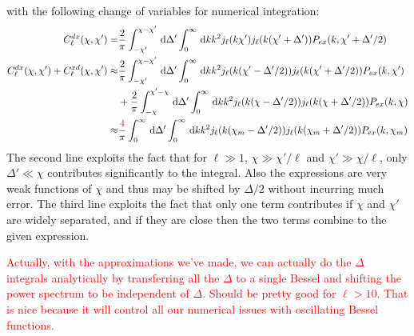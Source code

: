 \documentclass[twocolumn,prl,nofootinbib]{revtex4-1}
\newcommand{\ud}{\,\mathrm{d}}
\newcommand{\red}{\textcolor{red}}
\begin{document}
\begin{widetext}
with the following change of variables for numerical integration:
\begin{align}
C^{dx}_\ell(\chi,\chi')
    =&
    \frac{2}{\pi}
    \int_{-\chi'}^{\chi - \chi'}\ud\Delta'
    \int_0^\infty\ud k k^2 j_\ell(k\chi')
    j_{\ell}(k(\chi'+\Delta'))
    P_{ex}(k, \chi' + \Delta'/2)
    \\
C^{dx}_\ell(\chi,\chi') + C^{xd}_\ell(\chi,\chi')
    \approx&
    \frac{2}{\pi}
    \int_{-\chi'}^{\chi - \chi'}\ud\Delta'
    \int_0^\infty\ud k k^2 j_\ell(k(\chi'-\Delta'/2))
    j_{\ell}(k(\chi'+\Delta'/2))
    P_{ex}(k, \chi')
    \nonumber\\
    &+
    \frac{2}{\pi}
    \int_{-\chi}^{\chi' - \chi}\ud\Delta'
    \int_0^\infty\ud k k^2 j_\ell(k(\chi-\Delta'/2))
    j_{\ell}(k(\chi+\Delta'/2))
    P_{ex}(k, \chi)\\
    \approx&
    \frac{\red{4}}{\pi}
    \int_{0}^{\infty}\ud\Delta'
    \int_0^\infty\ud k k^2 j_\ell(k(\chi_m-\Delta'/2))
    j_{\ell}(k(\chi_m+\Delta'/2))
    P_{ex}(k, \chi_m)
\end{align}
The second line exploits the fact that for $\ell \gg 1$, $\chi \gg \chi'/\ell$ and
$\chi' \gg \chi/\ell$, only $\Delta'\ll\chi$ contributes significantly to the
integral. Also the expressions are very weak functions of $\chi$ and thus
may be shifted by $\Delta/2$ without incurring much error. The third line
exploits the fact that only one term contributes if $\chi$ and $\chi'$ are
widely separated, and if they are close then the two terms combine to the given
expression.

\red{Actually, with the approximations we've made, we can actually do the
$\Delta$ integrals analytically by transferring all the $\Delta$ to a single
Bessel and shifting the power spectrum to be independent of $\Delta$.  Should
be pretty good for $\ell > 10$.  That is nice because it will control all our
numerical issues with oscillating Bessel functions.}


\end{widetext}
\end{document}
